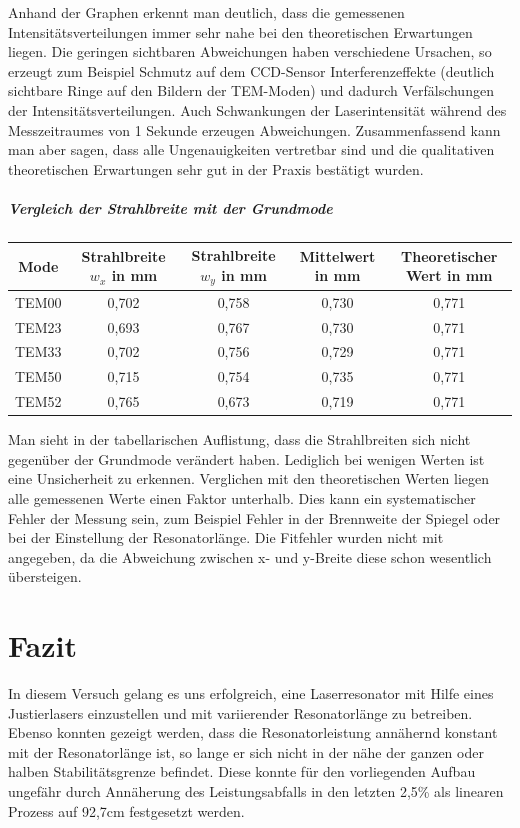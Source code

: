 \documentclass[bigchapter,colorback,accentcolor=tud4b,linedtoc,11pt]{tudreport}
\numberwithin{equation}{subsection}
\begin{document}
\FloatBarrier
Anhand der Graphen erkennt man deutlich, dass die gemessenen Intensitätsverteilungen immer sehr nahe bei den theoretischen Erwartungen liegen. Die geringen sichtbaren Abweichungen haben verschiedene Ursachen, so erzeugt zum Beispiel Schmutz auf dem CCD-Sensor Interferenzeffekte (deutlich sichtbare Ringe auf den Bildern der TEM-Moden) und dadurch Verfälschungen der Intensitätsverteilungen. Auch Schwankungen der Laserintensität während des Messzeitraumes von 1 Sekunde erzeugen Abweichungen. Zusammenfassend kann man aber sagen, dass alle Ungenauigkeiten vertretbar sind und die qualitativen theoretischen Erwartungen sehr gut in der Praxis bestätigt wurden.

\paragraph{Vergleich der Strahlbreite mit der Grundmode}

\begin{center}
	\begin{tabular}{c|c|c|c|c}
        Mode & Strahlbreite $w_x$ in mm & Strahlbreite $w_y$ in mm & Mittelwert in mm & Theoretischer Wert in mm \\ \hline
        TEM00 & 0,702 & 0,758 & 0,730 & 0,771 \\ 
        TEM23 & 0,693 & 0,767 & 0,730 & 0,771 \\
        TEM33 & 0,702 & 0,756 & 0,729 & 0,771 \\
        TEM50 & 0,715 & 0,754 & 0,735 & 0,771 \\
        TEM52 & 0,765 & 0,673 & 0,719 & 0,771 


	\end{tabular}
\end{center}

Man sieht in der tabellarischen Auflistung, dass die Strahlbreiten sich nicht gegenüber der Grundmode verändert haben. Lediglich bei wenigen Werten ist eine Unsicherheit zu erkennen. Verglichen mit den theoretischen Werten liegen alle gemessenen Werte einen Faktor unterhalb. Dies kann ein systematischer Fehler der Messung sein, zum Beispiel Fehler in der Brennweite der Spiegel oder bei der Einstellung der Resonatorlänge. Die Fitfehler wurden nicht mit angegeben, da die Abweichung zwischen x- und y-Breite diese schon wesentlich übersteigen.
 
\chapter{Fazit}
In diesem Versuch gelang es uns erfolgreich, eine Laserresonator mit Hilfe eines Justierlasers einzustellen und mit variierender Resonatorlänge zu betreiben. Ebenso konnten gezeigt werden, dass die Resonatorleistung annähernd konstant mit der Resonatorlänge ist, so lange er sich nicht in der nähe der ganzen oder halben Stabilitätsgrenze befindet. Diese konnte für den vorliegenden Aufbau ungefähr durch Annäherung des Leistungsabfalls in den letzten 2,5\% als linearen Prozess auf 92,7cm festgesetzt werden.
\end{document}

